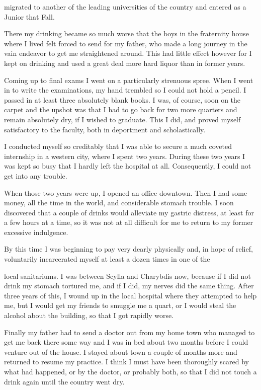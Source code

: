 \begin{biblechapter}
migrated to another of the leading universities of the country and entered as a Junior that Fall.

There my drinking became so much worse that the boys in the fraternity house where I lived felt forced to send for my father, who made a long journey in the vain endeavor to get me straightened around. This had little effect however for I kept on drinking and used a great deal more hard liquor than in former years.

Coming up to final exams I went on a particularly strenuous spree. When I went in to write the examinations, my hand trembled so I could not hold a pencil. I passed in at least three absolutely blank books. I was, of course, soon on the carpet and the upshot was that I had to go back for two more quarters and remain absolutely dry, if I wished to graduate. This I did, and proved myself satisfactory to the faculty, both in deportment and scholastically.

I conducted myself so creditably that I was able to secure a much coveted internship in a western city, where I spent two years. During these two years I was kept so busy that I hardly left the hospital at all. Consequently, I could not get into any trouble.

When those two years were up, I opened an office downtown. Then I had some money, all the time in the world, and considerable stomach trouble. I soon discovered that a couple of drinks would alleviate my gastric distress, at least for a few hours at a time, so it was not at all difficult for me to return to my former excessive indulgence.

By this time I was beginning to pay very dearly physically and, in hope of relief, voluntarily incarcerated myself at least a dozen times in one of the

local sanitariums. I was between Scylla and Charybdis now, because if I did not drink my stomach tortured me, and if I did, my nerves did the same thing. After three years of this, I wound up in the local hospital where they attempted to help me, but I would get my friends to smuggle me a quart, or I would steal the alcohol about the building, so that I got rapidly worse.

Finally my father had to send a doctor out from my home town who managed to get me back there some way and I was in bed about two months before I could venture out of the house. I stayed about town a couple of months more and returned to resume my practice. I think I must have been thoroughly scared by what had happened, or by the doctor, or probably both, so that I did not touch a drink again until the country went dry.


\end{biblechapter}
